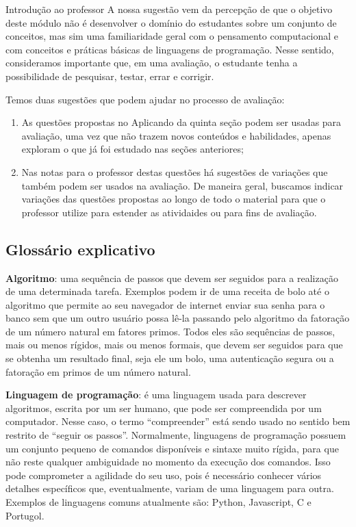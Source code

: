 \begin{apresentacao}{Introdução ao professor}
A nossa sugestão vem da percepção de que o objetivo deste módulo não é desenvolver o domínio do estudantes sobre um conjunto de conceitos, mas sim uma familiaridade geral com o pensamento computacional e com conceitos e práticas básicas de linguagens de programação. Nesse sentido, consideramos importante que, em uma avaliação, o estudante tenha a possibilidade de pesquisar, testar, errar e corrigir.

Temos duas sugestões que podem ajudar no processo de avaliação:

\begin{enumerate}
\item As questões propostas no Aplicando da quinta seção podem ser usadas para avaliação, uma vez que não trazem novos conteúdos e habilidades, apenas exploram o que já foi estudado nas seções anteriores;
\item Nas notas para o professor destas questões há sugestões de variações que também podem ser usados na avaliação. De maneira geral, buscamos indicar variações das questões propostas ao longo de todo o material para que o professor utilize para estender as atividaides ou para fins de avaliação.
\end{enumerate}

\subsection{Glossário explicativo}

\textbf{Algoritmo}: uma sequência de passos que devem ser seguidos para a realização de uma determinada tarefa. Exemplos podem ir de uma receita de bolo até o algoritmo que permite ao seu navegador de internet enviar sua senha para o banco sem que um outro usuário possa lê-la passando pelo algoritmo da fatoração de um número natural em fatores primos. Todos eles são sequências de passos, mais ou menos rígidos, mais ou menos formais, que devem ser seguidos para que se obtenha um resultado final, seja ele um bolo, uma autenticação segura ou a fatoração em primos de um número natural.

\textbf{Linguagem de programação}: é uma linguagem usada para descrever algoritmos, escrita por um ser humano, que pode ser compreendida por um computador. Nesse caso, o termo “compreender” está sendo usado no sentido bem restrito de “seguir os passos”. Normalmente, linguagens de programação possuem um conjunto pequeno de comandos disponíveis e sintaxe muito rígida, para que não reste qualquer ambiguidade no momento da execução dos comandos. Isso pode comprometer a agilidade do seu uso, pois é necessário conhecer vários detalhes específicos que, eventualmente, variam de uma linguagem para outra. Exemplos de linguagens comuns atualmente são: Python, Javascript, C e Portugol.


\end{apresentacao}
